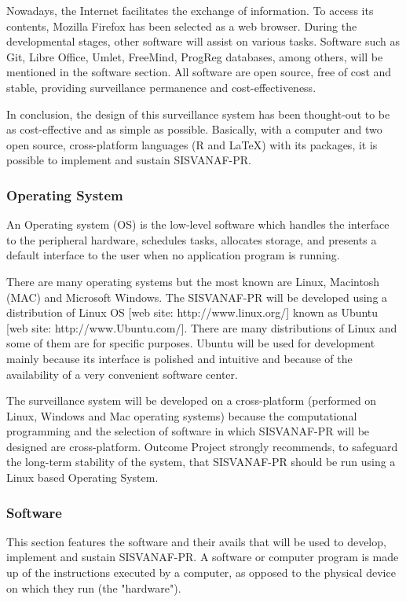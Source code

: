 \documentclass[12pt,letterpaper]{report}
\begin{document}
Nowadays, the Internet facilitates the exchange of information. To access its contents,
Mozilla Firefox has been selected as a web browser.  During the developmental stages, other software will assist on various tasks. Software such as Git, Libre Office, Umlet, FreeMind, ProgReg databases, among others, will be mentioned in the software section. All software are open source, free of cost and stable, providing surveillance permanence and cost-effectiveness.

In conclusion, the design of this surveillance system has been thought-out to be as cost-effective and as simple as possible. Basically, with a computer and two open source, cross-platform languages (R and \LaTeX) with its packages, it is possible to implement and sustain SISVANAF-PR.
\subsubsection{Operating System}
 An Operating system (OS) is the low-level software which handles the interface to the peripheral hardware, schedules tasks, allocates storage, and presents a default interface to the user when no application program is running. \cite{howe2010foldoc}

There are many operating systems but the most known are Linux, Macintosh (MAC) and Microsoft Windows. The SISVANAF-PR will be developed using a distribution of Linux OS [web site: http://www.linux.org/] known as Ubuntu [web site: http://www.Ubuntu.com/]. There are many distributions of Linux and some of them are for specific purposes. Ubuntu will be used for development mainly because its interface is polished and intuitive and because of the availability of a very convenient software center. 

The surveillance system will be developed on a cross-platform (performed on Linux, Windows and Mac operating systems) because the computational programming and the selection of software in which SISVANAF-PR will be designed are cross-platform.  Outcome Project strongly recommends, to safeguard the long-term stability of the system, that SISVANAF-PR should be run using a Linux based Operating System.

\subsubsection{Software}
 
This section features the software and their avails that will be used to develop, implement and sustain SISVANAF-PR. A software or computer program is made up of the instructions executed by a computer, as opposed to the physical device on which they run (the "hardware"). \cite{howe2010foldoc}
\end{document}
